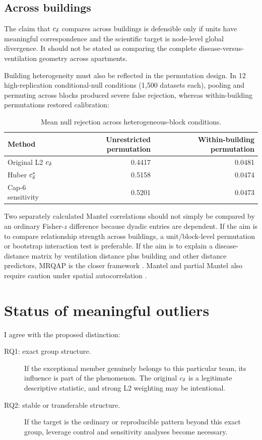 \subsection{Across buildings}

The claim that $c_\delta$ compares across buildings is defensible only if units
have meaningful correspondence and the scientific target is node-level global
divergence. It should not be stated as comparing the complete disease-versus-
ventilation geometry across apartments.

Building heterogeneity must also be reflected in the permutation design. In
12 high-replication conditional-null conditions (1,500 datasets each), pooling
and permuting across blocks produced severe false rejection, whereas
within-building permutations restored calibration:

\begin{table}[ht]
\centering
\caption{Mean null rejection across heterogeneous-block conditions.}
\small
\begin{tabular}{lrr}
\hline
Method & Unrestricted permutation & Within-building permutation\\
\hline
Original L2 $c_\delta$ & 0.4417 & 0.0481\\
Huber $c_\delta^\ast$ & 0.5158 & 0.0474\\
Cap-6 sensitivity & 0.5201 & 0.0473\\
\hline
\end{tabular}
\end{table}

Two separately calculated Mantel correlations should not simply be compared
by an ordinary Fisher-$z$ difference because dyadic entries are dependent.
If the aim is to compare relationship strength across buildings, a
unit/block-level permutation or bootstrap interaction test is preferable. If
the aim is to explain a disease-distance matrix by ventilation distance plus
building and other distance predictors, MRQAP is the closer framework
\cite{dekker2007}. Mantel and partial Mantel also require caution under spatial
autocorrelation \cite{guillot2013}.

\section{Status of meaningful outliers}

I agree with the proposed distinction:
\begin{description}
\item[RQ1: exact group structure.] If the exceptional member genuinely
belongs to this particular team, its influence is part of the phenomenon.
The original $c_\delta$ is a legitimate descriptive statistic, and strong L2
weighting may be intentional.
\item[RQ2: stable or transferable structure.] If the target is the ordinary
or reproducible pattern beyond this exact group, leverage control and
sensitivity analyses become necessary.
\end{description}

